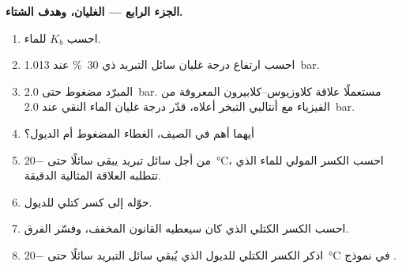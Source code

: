 \begin{problem}
\medskip
\noindent\textbf{الجزء الرابع --- الغليان، وهدف الشتاء.}
\begin{enumerate}[resume]
  \item احسب $K_b$ للماء.
  \item احسب ارتفاع درجة غليان سائل التبريد ذي \qty{30}{\percent}
        عند \qty{1.013}{bar}.
  \item المبرّد مضغوط حتى \qty{2.0}{bar}. مستعملًا علاقة
        كلاوزيوس--كلابيرون المعروفة من الفيزياء مع أنتالبي التبخر
        أعلاه، قدّر درجة غليان الماء النقي عند
        \qty{2.0}{bar}.
  \item أيهما أهم في الصيف، الغطاء المضغوط أم الديول؟
  \item من أجل سائل تبريد يبقى سائلًا حتى \qty{-20}{\celsius}، احسب الكسر
        المولي للماء الذي تتطلبه العلاقة المثالية الدقيقة.
  \item حوّله إلى كسر كتلي للديول.
  \item احسب الكسر الكتلي الذي كان سيعطيه القانون المخفف،
        وفسّر الفرق.
  \item اذكر الكسر الكتلي للديول الذي يُبقي سائل التبريد سائلًا حتى
        \qty{-20}{\celsius} في نموذج .
\end{enumerate}
\end{problem}
